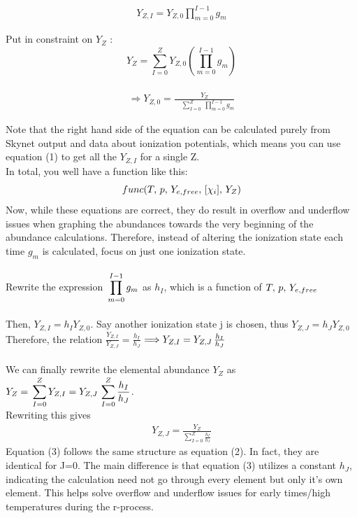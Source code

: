 \documentclass[11pt,a4paper]{article}
\begin{document}
\begin{align} 
Y_{Z,I} = Y_{Z,0} \prod_{m=0}^{I - 1} g_m 
\end{align}

Put in constraint on $Y_Z$ : $$ Y_Z = \sum_{I=0}^{Z} Y_{Z,0} \left(\prod_{m=0}^{I - 1} g_m\right) $$\\
\begin{align} 
\Longrightarrow Y_{Z,0} = \frac{Y_Z}{\quad \displaystyle \sum_{I=0}^{Z} \medspace \prod_{m=0}^{I - 1} g_m}
\end{align}

Note that the right hand side of the equation can be calculated purely from Skynet output and data about ionization potentials, which means you can use equation (1) to get all the $Y_{Z,I}$ for a single Z. 
\\
In total, you well have a function like this: $$func(T,\thinspace p,\thinspace Y_{e,free},\thinspace [\chi_i],\thinspace Y_Z)$$
Now, while these equations are correct, they do result in overflow and underflow issues when graphing the abundances towards the very beginning of the abundance calculations. Therefore, instead of altering the ionization state each time $g_m$ is calculated, focus on just one ionization state. 
\\\\
Rewrite the expression  $\thinspace \displaystyle \prod_{m=0}^{I - 1} g_m$ as $h_I$, which is a function of $T,\thinspace p,\thinspace Y_{e,free}$ \\\\
Then, $Y_{Z,I} = h_I  Y_{Z,0}$. Say another ionization state j is chosen, thus $Y_{Z,J} = h_J  Y_{Z,0}$ \\Therefore, the relation $\frac{Y_{Z,I}}{Y_{Z,J}} = \frac{h_I}{h_J} $ $\Longrightarrow
Y_{Z,I} = Y_{Z,J}\thinspace \frac{h_I}{h_J}$ \\\\
We can finally rewrite the elemental abundance $Y_Z$ as $Y_Z =\thinspace \displaystyle \sum_{I=0}^{Z} Y_{Z,I} = Y_{Z,J}\thinspace \displaystyle \sum_{I=0}^{Z} \frac{h_I}{h_J} $.\\ Rewriting this gives 
\begin{align}
Y_{Z,J} = \frac{Y_Z}{\displaystyle \sum_{I=0}^{Z} \frac{h_I}{h_J}}
\end{align} 
Equation (3) follows the same structure as equation (2). In fact, they are identical for J=0. The main difference is that equation (3) utilizes a constant $h_J$, indicating the calculation need not go through every element but only it's own element. This helps solve overflow and underflow issues for early times/high temperatures during the r-process. \\\\
\end{document}
